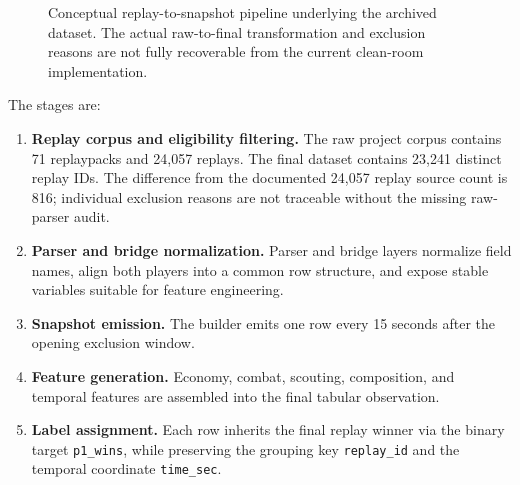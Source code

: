 \documentclass[11pt,a4paper]{article}
\begin{document}
\begin{figure}[H]
\centering
{}
\caption{Conceptual replay-to-snapshot pipeline underlying the archived dataset. The actual raw-to-final transformation and exclusion reasons are not fully recoverable from the current clean-room implementation.}
\label{fig:pipeline}
\end{figure}

The stages are:
\begin{enumerate}
    \item \textbf{Replay corpus and eligibility filtering.} The raw project corpus contains 71 replaypacks and 24,057 replays. The final dataset contains 23,241 distinct replay IDs. The difference from the documented 24,057 replay source count is 816; individual exclusion reasons are not traceable without the missing raw-parser audit.
    \item \textbf{Parser and bridge normalization.} Parser and bridge layers normalize field names, align both players into a common row structure, and expose stable variables suitable for feature engineering.
    \item \textbf{Snapshot emission.} The builder emits one row every 15 seconds after the opening exclusion window.
    \item \textbf{Feature generation.} Economy, combat, scouting, composition, and temporal features are assembled into the final tabular observation.
    \item \textbf{Label assignment.} Each row inherits the final replay winner via the binary target \texttt{p1\_wins}, while preserving the grouping key \texttt{replay\_id} and the temporal coordinate \texttt{time\_sec}.
\end{enumerate}
\end{document}
